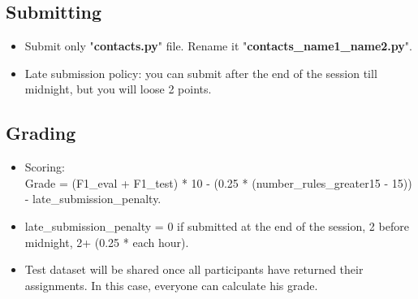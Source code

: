 \documentclass{../../../extra/aakpract/aakpract}
\begin{document}
\subsection{Submitting}

\begin{itemize}
	\item Submit only "\textbf{contacts.py}" file.
	Rename it "\textbf{contacts\_name1\_name2.py}".
	\item Late submission policy: you can submit after the end of the session till midnight, but you will loose 2 points.
\end{itemize}

\subsection{Grading}

\begin{itemize}
	\item Scoring: \\Grade = (F1\_eval + F1\_test) * 10 - (0.25 * (number\_rules\_greater15 - 15)) - late\_submission\_penalty.
	\item late\_submission\_penalty = 0 if submitted at the end of the session, 2 before midnight, 2+ (0.25 * each hour).
	\item Test dataset will be shared once all participants have returned their assignments. In this case, everyone can calculate his grade.
\end{itemize}
\end{document}
